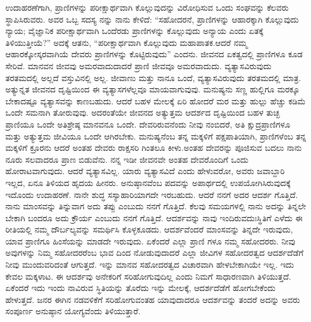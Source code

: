 ಉದಾಹರಣೆಗಾಗಿ, ಪ್ರಾಣಿಗಳನ್ನು ಪರೀಕ್ಷಾರ್ಥವಾಗಿ ಕೊಲ್ಲುವುದನ್ನು ವಿರೋಧಿಸುವ ಒಂದು ಸಂಘವನ್ನು ಕೆಲವರು ಸ್ಥಾಪಿಸಿರುವರು. ಅವರ ಒಬ್ಬ ಸದಸ್ಯ ನನ್ನು ನಾನು ಕೇಳಿದೆ: “ಸಹೋದರನೆ, ಪ್ರಾಣಿಗಳನ್ನು ಆಹಾರಕ್ಕಾಗಿ ಕೊಲ್ಲುವುದು ನ್ಯಾಯ; ವೈಜ್ಞಾನಿಕ ಪರೀಕ್ಷಾರ್ಥವಾಗಿ ಒಂದೆರಡು ಪ್ರಾಣಿಗಳನ್ನು ಕೊಲ್ಲುವುದು ಅನ್ಯಾಯ ಎಂದು ಏತಕ್ಕೆ ತಿಳಿಯುತ್ತೀಯೆ?” ಅದಕ್ಕೆ ಆತನು, “ಪರೀಕ್ಷಾರ್ಥವಾಗಿ ಕೊಲ್ಲುವುದು ಮಹಾಪಾತಕ.ಆದರೆ ನಮ್ಮ ಆಹಾರಕ್ಕೋಸ್ಕರವಾಗಿಯೆ ದೇವರು ಪ್ರಾಣಿಗಳನ್ನು ಕೊಟ್ಟಿರುವುದು” ಎಂದನು. ಜೀವನದ ಏಕತ್ವದಲ್ಲಿ ಪ್ರಾಣಿಗಳೂ ಕೂಡ ಸೇರಿವೆ. ಮಾನವನ ಜೀವವು ಅಮರವಾದುದಾದರೆ ಪ್ರಾಣಿ ಜೀವವೂ ಅಮರವಾದುದು. ವ್ಯತ್ಯಾಸವಿರುವುದು ತರತಮದಲ್ಲಿ ಅಲ್ಲದೆ ವಸ್ತುವಿನಲ್ಲಿ ಅಲ್ಲ. ಜೀವಾಣು ಮತ್ತು ನಾನೂ ಒಂದೆ, ವ್ಯತ್ಯಾಸವಿರುವುದು ತರತಮದಲ್ಲಿ ಮಾತ್ರ. ಅತ್ಯುನ್ನತ ಜೀವನದ ದೃಷ್ಟಿಯಿಂದ ಈ ವ್ಯತ್ಯಾಸಗಳೆಲ್ಲವೂ ಮಾಯವಾಗುವುವು. ಮನುಷ್ಯನು ಸಣ್ಣ ಹುಲ್ಲಿಗೂ ಮರಕ್ಕೂ ಬೇಕಾದಷ್ಟೂ ವ್ಯತ್ಯಾಸವನ್ನು ಕಾಣಬಹುದು. ಆದರೆ ಬಹಳ ಮೇಲಕ್ಕೆ ಏರಿ ಹೋದರೆ ಮರ ಮತ್ತು ಹುಲ್ಲು ಹೆಚ್ಚು ಕಡಿಮೆ ಒಂದೇ ಸಮನಾಗಿ ತೋರುವುವು. ಅದರಂತೆಯೇ ಜೀವನದ ಅತ್ಯುತ್ತಮ ಆದರ್ಶದ ದೃಷ್ಟಿಯಿಂದ ಬಹಳ ತುಚ್ಛ ಪ್ರಾಣಿಯೂ ಒಂದೇ ಅತಿಶ್ರೇಷ್ಠ ಮಾನವನೂ ಒಂದೇ. ದೇವರಿರುವನೆಂದು ನೀವು ನಂಬಿದರೆ, ಅತಿ ಕ್ಷುದ್ರಪ್ರಾಣಿಗಳೂ ಮತ್ತು ಅತ್ಯುತ್ತಮ ಜೀವಿಯೂ ಒಂದೇ ಆಗಿರಬೇಕು. ಮನುಷ್ಯನೆಂಬ ತನ್ನ ಮಕ್ಕಳಿಗೆ ಪಕ್ಷಪಾತಿಯಾಗಿ, ಪ್ರಾಣಿಗಳೆಂಬ ತನ್ನ ಮಕ್ಕಳಿಗೆ ಕ್ರೂರನು ಆದರೆ ಅಂತಹ ದೇವರು ರಾಕ್ಷಸರಿ ಗಿಂತಲೂ ಕೀಳು.ಅಂತಹ ದೇವರನ್ನು ಪೂಜಿಸುವ ಬದಲು ನಾನು ನೂರು ಸಲವಾದರೂ ಪ್ರಾಣ ಬಿಡುವೆನು. ನನ್ನ ಇಡೀ ಜೀವನವೇ ಅಂತಹ ದೇವರೊಂದಿಗೆ ಒಂದು ಹೋರಾಟವಾಗುವುದು. ಆದರೆ ವ್ಯತ್ಯಾಸವಿಲ್ಲ. ಯಾರು ವ್ಯತ್ಯಾಸವಿದೆ ಎಂದು ಹೇಳುವರೋ, ಅವರು ಜವಾಬ್ದಾರಿ ಇಲ್ಲದ, ಏನೂ ತಿಳಿಯದ ಹೃದಯ ಹೀನರು. ಅನುಷ್ಠಾನವೆಂಬ ಪದವನ್ನು ಅಪಾರ್ಥದಲ್ಲಿ ಉಪಯೋಗಿಸಿರುವುದಕ್ಕೆ ಇದೊಂದು ಉದಾಹರಣೆ. ನಾನೇ ಶುದ್ಧ ಸಸ್ಯಾಹಾರಿಯಾಗದೇ ಇರಬಹುದು. ಆದರೆ ನನಗೆ ಅದರ ಆದರ್ಶ ಗೊತ್ತಿದೆ. ನಾನು ಮಾಂಸವನ್ನು ತಿನ್ನುವಾಗ ಅದು ತಪ್ಪು ಎಂಬುದು ನನಗೆ ಗೊತ್ತಿದೆ. ಕೆಲವು ಸಮಯಗಳಲ್ಲಿ ನಾನು ಅದನ್ನು ತಿನ್ನಲೇ ಬೇಕಾಗಿ ಬಂದರೂ ಅದು ಕ್ರೌರ್ಯ ಎಂಬುದು ನನಗೆ ಗೊತ್ತಿದೆ. ಆದರ್ಶವನ್ನು ನಾವು ಇಂದಿರುವದುಃಸ್ಥಿತಿಗೆ ಎಳೆದು ಈ ರೀತಿಯಲ್ಲಿ ನಮ್ಮ ದೌರ್ಬಲ್ಯವನ್ನು ಸಮರ್ಥಿಸಿ ಕೊಳ್ಳಕೂಡದು. ಆದರ್ಶವೆಂದರೆ ಮಾಂಸವನ್ನು ತಿನ್ನದೇ ಇರುವುದು, ಯಾವ ಪ್ರಾಣಿಗೂ ಹಿಂಸೆಯನ್ನು ಮಾಡದೇ ಇರುವುದು. ಏಕೆಂದರೆ ಎಲ್ಲಾ ಪ್ರಾಣಿ ಗಳೂ ನಮ್ಮ ಸಹೋದರರು. ನೀವು ಅವುಗಳನ್ನು ನಿಮ್ಮ ಸಹೋದರರೆಂಬ ಭಾವ ದಿಂದ ನೋಡುವುದಾದರೆ ಎಲ್ಲಾ ಜೀವಿಗಳ ಸಹೋದರತ್ವದ ಆದರ್ಶದೆಡೆಗೆ ನೀವು ಮುಂದುವರಿದಂತೆ ಆಗುತ್ತದೆ. ಇನ್ನು ಮಾನವ ಸಹೋದರತ್ವದ ವಿಚಾರವಾಗಿ ಹೇಳಬೇಕಾಗಿಯೇ ಇಲ್ಲ. ಇದು ಕೇವಲ ಮಕ್ಕಳಾಟ. ಈ ಆದರ್ಶವು ಅನೇಕರಿಗೆ ಸರಿಹೋಗುವುದಿಲ್ಲ ಎಂದು ನಿಮಗೆ ಸಾಧಾರಣವಾಗಿ ತಿಳಿಯುತ್ತದೆ. ಏಕೆಂದರೆ ಇದು ಇಂದು ನಾವಿರುವ ಸ್ಥಿತಿಯನ್ನು ತೊರೆದು ಇನ್ನು ಮೇಲಕ್ಕೆ, ಆದರ್ಶದೆಡೆಗೆ ಹೋಗಬೇಕೆಂದು ಹೇಳುತ್ತದೆ. ಜನರ ಈಗಿನ ನಡವಳಿಕೆಗೆ ಸರಿಹೋಗುವಂತಹ ಯಾವುದಾದರೂ ಆದರ್ಶವನ್ನು ತಂದರೆ ಅದನ್ನು ಅವರು ಸಂಪೂರ್ಣ ಅನುಷ್ಠಾನ ಯೋಗ್ಯವೆಂದು ತಿಳಿಯುತ್ತಾರೆ.

